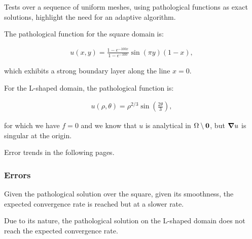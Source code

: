 Tests over a sequence of uniform meshes, using pathological functions as exact solutions, highlight the need for an adaptive algorithm.

\cite{Antonietti2013} The pathological function for the square domain is:

\begin{gather} \label{pathological_square}
    u(x, y) = \frac{1 - e^{-100x}}{1 - e^{-100}} \sin(\pi y) (1 - x),
\end{gather}

which exhibits a strong boundary layer along the line $x = 0$.

For the L-shaped domain, the pathological function is:

\begin{gather} \label{pathological_lshape}
    u(\rho, \theta) = \rho^{2 / 3} \sin\left(\frac{2 \theta}{3}\right),
\end{gather}

for which we have $f = 0$ and we know that $u$ is analytical in $\Omega \setminus \bm{0}$, but $\bm{\nabla}{u}$ is singular at the origin.

Error trends in the following pages.

\newpage
\subsubsection{Errors}

Given the pathological solution over the square, given its smoothness, the expected convergence rate is reached but at a slower rate.

	


\newpage

Due to its nature, the pathological solution on the L-shaped domain does not reach the expected convergence rate.

	

